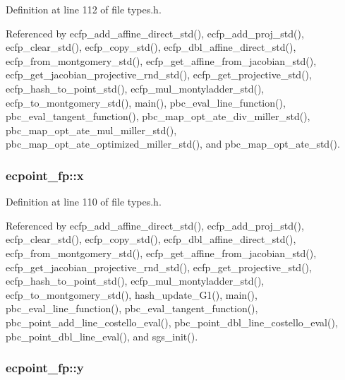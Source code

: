 Definition at line 112 of file types.\-h.



Referenced by ecfp\-\_\-add\-\_\-affine\-\_\-direct\-\_\-std(), ecfp\-\_\-add\-\_\-proj\-\_\-std(), ecfp\-\_\-clear\-\_\-std(), ecfp\-\_\-copy\-\_\-std(), ecfp\-\_\-dbl\-\_\-affine\-\_\-direct\-\_\-std(), ecfp\-\_\-from\-\_\-montgomery\-\_\-std(), ecfp\-\_\-get\-\_\-affine\-\_\-from\-\_\-jacobian\-\_\-std(), ecfp\-\_\-get\-\_\-jacobian\-\_\-projective\-\_\-rnd\-\_\-std(), ecfp\-\_\-get\-\_\-projective\-\_\-std(), ecfp\-\_\-hash\-\_\-to\-\_\-point\-\_\-std(), ecfp\-\_\-mul\-\_\-montyladder\-\_\-std(), ecfp\-\_\-to\-\_\-montgomery\-\_\-std(), main(), pbc\-\_\-eval\-\_\-line\-\_\-function(), pbc\-\_\-eval\-\_\-tangent\-\_\-function(), pbc\-\_\-map\-\_\-opt\-\_\-ate\-\_\-div\-\_\-miller\-\_\-std(), pbc\-\_\-map\-\_\-opt\-\_\-ate\-\_\-mul\-\_\-miller\-\_\-std(), pbc\-\_\-map\-\_\-opt\-\_\-ate\-\_\-optimized\-\_\-miller\-\_\-std(), and pbc\-\_\-map\-\_\-opt\-\_\-ate\-\_\-std().

\hypertarget{structecpoint__fp_a5d560562bc26a70f40189ad902070f28}{
\subsubsection[{x}]{ ecpoint\-\_\-fp\-::x}}\label{structecpoint__fp_a5d560562bc26a70f40189ad902070f28}


Definition at line 110 of file types.\-h.



Referenced by ecfp\-\_\-add\-\_\-affine\-\_\-direct\-\_\-std(), ecfp\-\_\-add\-\_\-proj\-\_\-std(), ecfp\-\_\-clear\-\_\-std(), ecfp\-\_\-copy\-\_\-std(), ecfp\-\_\-dbl\-\_\-affine\-\_\-direct\-\_\-std(), ecfp\-\_\-from\-\_\-montgomery\-\_\-std(), ecfp\-\_\-get\-\_\-affine\-\_\-from\-\_\-jacobian\-\_\-std(), ecfp\-\_\-get\-\_\-jacobian\-\_\-projective\-\_\-rnd\-\_\-std(), ecfp\-\_\-get\-\_\-projective\-\_\-std(), ecfp\-\_\-hash\-\_\-to\-\_\-point\-\_\-std(), ecfp\-\_\-mul\-\_\-montyladder\-\_\-std(), ecfp\-\_\-to\-\_\-montgomery\-\_\-std(), hash\-\_\-update\-\_\-\-G1(), main(), pbc\-\_\-eval\-\_\-line\-\_\-function(), pbc\-\_\-eval\-\_\-tangent\-\_\-function(), pbc\-\_\-point\-\_\-add\-\_\-line\-\_\-costello\-\_\-eval(), pbc\-\_\-point\-\_\-dbl\-\_\-line\-\_\-costello\-\_\-eval(), pbc\-\_\-point\-\_\-dbl\-\_\-line\-\_\-eval(), and sgs\-\_\-init().

\hypertarget{structecpoint__fp_a099711871e8206f551c4f1bfb8fa2903}{
\subsubsection[{y}]{ ecpoint\-\_\-fp\-::y}}\label{structecpoint__fp_a099711871e8206f551c4f1bfb8fa2903}


